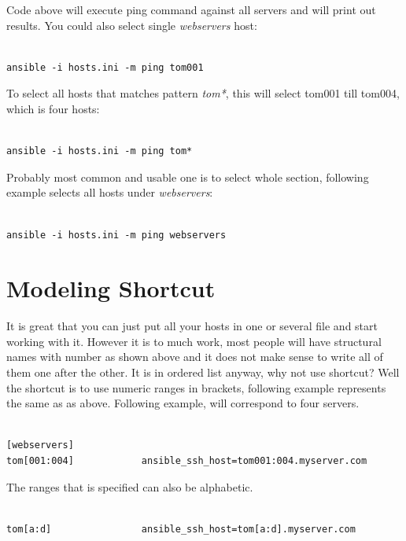 \documentclass[10pt]{book}
\begin{document}
Code above will execute ping command against all servers and will print out 
results. You could also select single \emph{webservers} host:

\begin{Verbatim}
  
ansible -i hosts.ini -m ping tom001

\end{Verbatim}

To select all hosts that matches pattern \emph{tom*}, this will select tom001 till 
tom004, which is four hosts:

\begin{Verbatim}
  
ansible -i hosts.ini -m ping tom*

\end{Verbatim}

Probably most common and usable one is to select whole section, following example selects 
all hosts under \emph{webservers}:

\begin{Verbatim}
  
ansible -i hosts.ini -m ping webservers

\end{Verbatim}


\section{Modeling Shortcut}
It is great that you can just put all your hosts in one or several file and start working with it.
However it is to much work, most people will have structural 
names with number as shown above and it does not make sense to write all of them one after the other.
It is in ordered list anyway, why not use shortcut? Well the shortcut is to use numeric ranges in brackets, 
following example represents the same as as above. Following example, will 
correspond to four servers.

\begin{Verbatim}

[webservers]
tom[001:004]			ansible_ssh_host=tom001:004.myserver.com 

\end{Verbatim}

The ranges that is specified can also be alphabetic.

\begin{Verbatim}

tom[a:d]				ansible_ssh_host=tom[a:d].myserver.com 

\end{Verbatim}
\end{document}
